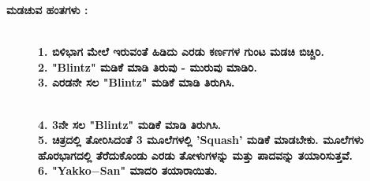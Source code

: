\noindent
\textbf{ಮಡಚುವ ಹಂತಗಳು :}
\begin{figure}[H]
\\
\textbf{1. ಬಿಳಿಭಾಗ ಮೇಲೆ ಇರುವಂತೆ ಹಿಡಿದು ಎರಡು ಕರ್ಣಗಳ ಗುಂಟ ಮಡಚಿ ಬಿಚ್ಚಿರಿ.}\\
\textbf{2. "Blintz" ಮಡಿಕೆ ಮಾಡಿ ತಿರುವು - ಮುರುವು ಮಾಡಿರಿ.}\\
\textbf{3. ಎರಡನೇ ಸಲ "Blintz" ಮಡಿಕೆ ಮಾಡಿ ತಿರುಗಿಸಿ.}
\end{figure}
\begin{figure}[H]
\\
\textbf{4. 3ನೇ ಸಲ "Blintz" ಮಡಿಕೆ ಮಾಡಿ ತಿರುಗಿಸಿ.}\\
\textbf{5. ಚಿತ್ರದಲ್ಲಿ ತೋರಿಸಿದಂತೆ 3 ಮೂಲೆಗಳಲ್ಲಿ  'Squash' ಮಡಿಕೆ ಮಾಡಬೇಕು. ಮೂಲೆಗಳು ಹೊರಭಾಗದಲ್ಲಿ ತೆರೆದುಕೊಂಡು ಎರಡು ತೋಳುಗಳನ್ನು ಮತ್ತು ಪಾದವನ್ನು ತಯಾರಿಸುತ್ತವೆ.}\\
\textbf{6. "Yakko$-$San" ಮಾದರಿ ತಯಾರಾಯಿತು.}
\end{figure}
